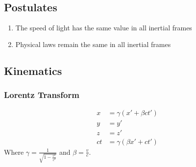 \documentclass[11pt, letterpaper]{article}
\begin{document}
\begin{multicols*}{3}
\subsection{Postulates}
\begin{enumerate}
\item The speed of light has the same value in all inertial frames
\item Physical laws remain the same in all inertial frames
\end{enumerate}
\subsection{Kinematics}
\subsubsection{Lorentz Transform}
\begin{align*}
  x&= \gamma (x' + \beta ct') \\
  y&=y' \\
  z&=z' \\
  ct&= \gamma (\beta x' + ct')
\end{align*}
Where $\gamma = \frac{1}{\sqrt{1-\frac{v^2}{c^2}}}$ and $\beta = \frac{v}{c}$.

\end{multicols*}
\end{document}
